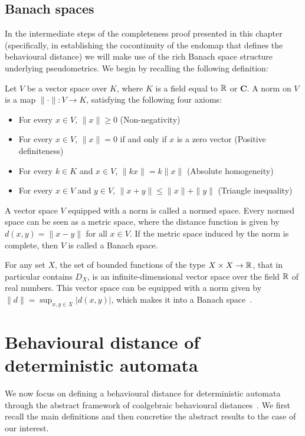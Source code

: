 \subsection{Banach spaces}
In the intermediate steps of the completeness proof presented in this chapter (specifically, in establishing the cocontinuity of the endomap that defines the behavioural distance) we will make use of the rich Banach space structure underlying pseudometrics. We begin by recalling the following definition:
\begin{definition}
	Let $V$ be a vector space over $K$, where $K$ is a field equal to $\mathbb{R}$ or $\mathbf{C}$. A norm on $V$ is a map $\| \cdot \| \colon V \to K$, satisfying the following four axioms: 
	\begin{itemize}
		\item For every $x \in V$, $\|x \| \geq 0$ (Non-negativity)
		\item For every $x \in V$, $\| x \| = 0$ if and only if $x$ is a zero vector (Positive definiteness)
		\item For every $k \in K$ and $x \in V$, $\| kx\|=k \|x\|$ (Absolute homogeneity) 
		\item For every $x \in V$ and $y \in V$, $\|x + y\| \leq \|x\| + \|y\|$ (Triangle inequality)
	\end{itemize}
	A vector space $V$ equipped with a norm is called a normed space. Every normed space can be seen as a metric space, where the distance function is given by $d(x,y)=\|x-y\|$ for all $x \in V$. If the metric space induced by the norm is complete, then $V$ is called a Banach space.
\end{definition}
For any set $X$, the set of bounded functions of the type $X \times X \to \mathbb{R}$, that in particular contains $D_X$, is an infinite-dimensional vector space over the field $\mathbb{R}$ of real numbers. This vector space can be equipped with a norm given by $\|d\| = \sup_{x,y \in X} |d(x,y)|$, which makes it into a Banach space~\cite{Breugel:2012:Closure}. 
\section{Behavioural distance of deterministic automata}\label{c2:sec:behavioural_distance}
We now focus on defining a behavioural distance for deterministic automata through the abstract framework of coalgebraic behavioural distances~\cite{Baldan:2018:Coalgebraic}. We first recall the main definitions and then concretise the abstract results to the case of our interest.
